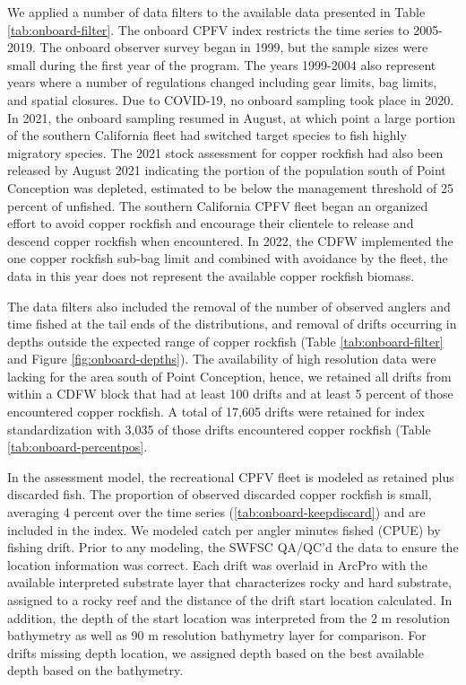 \documentclass[11pt,
  english,
  letterpaper,
]{article}
\begin{document}
We applied a number of data filters to the available data presented in Table \ref{tab:onboard-filter}. The onboard CPFV index restricts the time series to 2005-2019. The onboard observer survey began in 1999, but the sample sizes were small during the first year of the program. The years 1999-2004 also represent years where a number of regulations changed including gear limits, bag limits, and spatial closures. Due to COVID-19, no onboard sampling took place in 2020. In 2021, the onboard sampling resumed in August, at which point a large portion of the southern California fleet had switched target species to fish highly migratory species. The 2021 stock assessment for copper rockfish had also been released by August 2021 indicating the portion of the population south of Point Conception was depleted, estimated to be below the management threshold of 25 percent of unfished. The southern California CPFV fleet began an organized effort to avoid copper rockfish and encourage their clientele to release and descend copper rockfish when encountered. In 2022, the CDFW implemented the one copper rockfish sub-bag limit and combined with avoidance by the fleet, the data in this year does not represent the available copper rockfish biomass.

The data filters also included the removal of the number of observed anglers and time fished at the tail ends of the distributions, and removal of drifts occurring in depths outside the expected range of copper rockfish (Table \ref{tab:onboard-filter} and Figure \ref{fig:onboard-depths}). The availability of high resolution data were lacking for the area south of Point Conception, hence, we retained all drifts from within a CDFW block that had at least 100 drifts and at least 5 percent of those encountered copper rockfish. A total of 17,605 drifts were retained for index standardization with 3,035 of those drifts encountered copper rockfish (Table \ref{tab:onboard-percentpos}.

In the assessment model, the recreational CPFV fleet is modeled as retained plus discarded fish. The proportion of observed discarded copper rockfish is small, averaging 4 percent over the time series (\ref{tab:onboard-keepdiscard}) and are included in the index. We modeled catch per angler minutes fished (CPUE) by fishing drift. Prior to any modeling, the SWFSC QA/QC'd the data to ensure the location information was correct. Each drift was overlaid in ArcPro with the available interpreted substrate layer that characterizes rocky and hard substrate, assigned to a rocky reef and the distance of the drift start location calculated. In addition, the depth of the start location was interpreted from the 2 m resolution bathymetry as well as 90 m resolution bathymetry layer for comparison. For drifts missing depth location, we assigned depth based on the best available depth based on the bathymetry.
\end{document}
